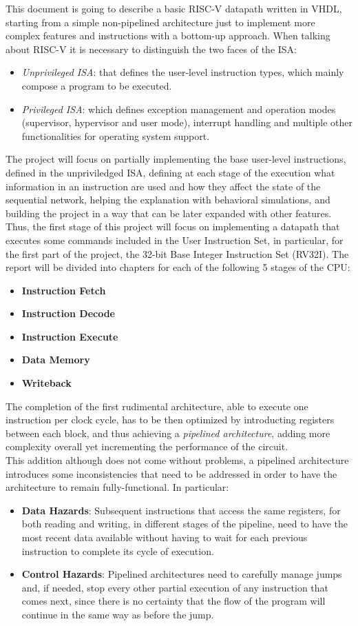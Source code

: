 This document is going to describe a basic RISC-V datapath written in VHDL, starting from a simple non-pipelined architecture just to implement more complex features and instructions with a bottom-up approach.
When talking about RISC-V it is necessary to distinguish the two faces of the ISA:
\begin{itemize}
    \item \emph{Unprivileged ISA}: that defines the user-level instruction types, which mainly compose a program to be executed.
    \item \emph{Privileged ISA}: which defines exception management and operation modes (supervisor, hypervisor and user mode), interrupt handling and multiple other functionalities for operating system support.
\end{itemize}
The project will focus on partially implementing the base user-level instructions, defined in the unpriviledged ISA, defining at each stage of the execution what information in an instruction are used and how they affect the state of the sequential network, helping the explanation with behavioral simulations, and building the project in a way that can be later expanded with other features.
Thus, the first stage of this project will focus on implementing a datapath that executes some commands included in the User Instruction Set, in particular, for the first part of the project, the 32-bit Base Integer Instruction Set (RV32I).
The report will be divided into chapters for each of the following 5 stages of the CPU:
\begin{itemize}
\item \textbf{Instruction Fetch}
\item \textbf{Instruction Decode} 
\item \textbf{Instruction Execute} 
\item \textbf{Data Memory}
\item \textbf{Writeback} 
\end{itemize}
The completion of the first rudimental architecture, able to execute one instruction per clock cycle, has to be then optimized by introducting registers between each block, and thus achieving a \emph{pipelined architecture}, adding more complexity overall yet incrementing the performance of the circuit.\\
This addition although does not come without problems, a pipelined architecture introduces some inconsistencies that need to be addressed in order to have the architecture to remain fully-functional. In particular:
\begin{itemize}
    \item \textbf{Data Hazards}: Subsequent instructions that access the same registers, for both reading and writing, in different stages of the pipeline, need to have the most recent data available without having to wait for each previous instruction to complete its cycle of execution.
    \item \textbf{Control Hazards}: Pipelined architectures need to carefully manage jumps and, if needed, stop every other partial execution of any instruction that comes next, since there is no certainty that the flow of the program will continue in the same way as before the jump.
\end{itemize}
